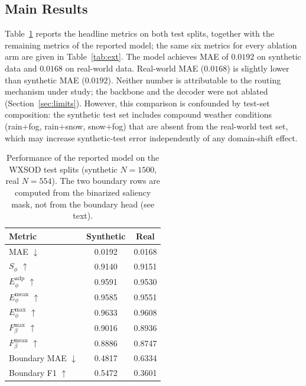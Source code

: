 \documentclass[10pt,a4paper,twocolumn,twoside]{article}
\begin{document}
\subsection{Main Results}
Table~\ref{tab:main} reports the headline metrics on both test splits, together with the
remaining metrics of the reported model; the same six metrics for every ablation arm are given in
Table~\ref{tab:ext}.
The model achieves MAE of $0.0192$ on synthetic data and $0.0168$ on real-world data.
Real-world MAE ($0.0168$) is slightly lower than synthetic MAE ($0.0192$). Neither number is
attributable to the routing mechanism under study; the backbone and the decoder were not
ablated (Section~\ref{sec:limits}).
However, this comparison is confounded by test-set composition: the synthetic test set includes
compound weather conditions (rain+fog, rain+snow, snow+fog) that are absent from the real-world
test set, which may increase synthetic-test error independently of any domain-shift effect.

\begin{table}[tbp]
\centering
\caption{Performance of the reported model on the WXSOD test splits (synthetic $N{=}1500$,
real $N{=}554$). The two boundary rows are computed from the binarized saliency mask, not from
the boundary head (see text).}
\label{tab:main}
\small
\begin{tabular}{@{}lcc@{}}
\toprule
Metric & Synthetic & Real \\
\midrule
MAE $\downarrow$                  & 0.0192 & 0.0168 \\
$S_\phi$ $\uparrow$               & 0.9140 & 0.9151 \\
$E_\phi^{\text{adp}}$ $\uparrow$  & 0.9591 & 0.9530 \\
$E_\phi^{\text{mean}}$ $\uparrow$ & 0.9585 & 0.9551 \\
$E_\phi^{\max}$ $\uparrow$        & 0.9633 & 0.9608 \\
$F_\beta^{\max}$ $\uparrow$       & 0.9016 & 0.8936 \\
$F_\beta^{\text{mean}}$ $\uparrow$ & 0.8886 & 0.8747 \\
\midrule
Boundary MAE $\downarrow$         & 0.4817 & 0.6334 \\
Boundary F1 $\uparrow$            & 0.5472 & 0.3601 \\
\bottomrule
\end{tabular}
\end{table}
\end{document}
